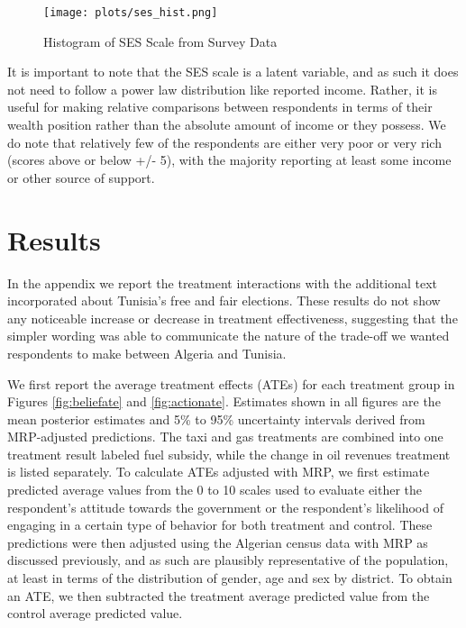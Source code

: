 \documentclass[12pt, letterpaper]{article}
\begin{document}
\begin{figure}
    \centering
    \texttt{[image: plots/ses\_hist.png]}
    \caption{Histogram of SES Scale from Survey Data}
    \label{ses}
\end{figure}

It is important to note that the SES scale is a latent variable, and as such it does not need to follow a power law distribution like reported income. Rather, it is useful for making relative comparisons between respondents in terms of their wealth position rather than the absolute amount of income or they possess. We do note that relatively few of the respondents are either very poor or very rich (scores above or below +/- 5), with the majority reporting at least some income or other source of support. 


\section*{Results}

In the appendix we report the treatment interactions with the additional text incorporated about Tunisia's free and fair elections. These results do not show any noticeable increase or decrease in treatment effectiveness, suggesting that the simpler wording was able to communicate the nature of the trade-off we wanted respondents to make between Algeria and Tunisia. 

We first report the average treatment effects (ATEs) for each treatment group in Figures \ref{fig:beliefate}
 and \ref{fig:actionate}. Estimates shown in all figures are the mean posterior estimates and 5\% to 95\% uncertainty intervals derived from MRP-adjusted predictions. The taxi and gas treatments are combined into one treatment result labeled fuel subsidy, while the change in oil revenues treatment is listed separately. To calculate ATEs adjusted with MRP, we first estimate predicted average values from the 0 to 10 scales used to evaluate either the respondent's attitude towards the government or the respondent's likelihood of engaging in a certain type of behavior for both treatment and control. These predictions were then adjusted using the Algerian census data with MRP as discussed previously, and as such are plausibly representative of the population, at least in terms of the distribution of gender, age and sex by district. To obtain an ATE, we then subtracted the treatment average predicted value from the control average predicted value.
 
\end{document}
